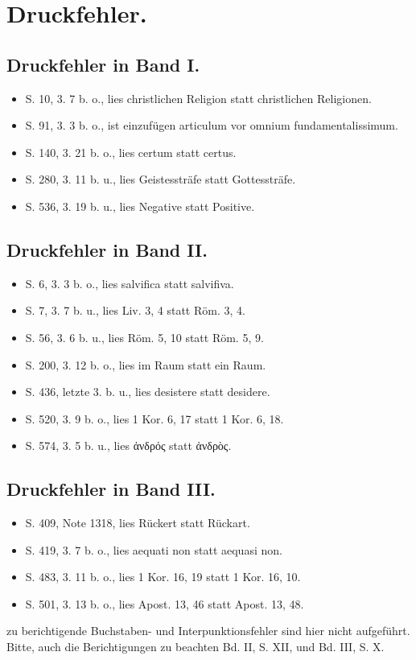\centering\n\section*{Druckfehler.}\n\n\subsection*{\textbf{Druckfehler in Band I.}}\n\begin{itemize}\n    \item S. 10, 3. 7 b. o., lies christlichen Religion statt christlichen Religionen.\n    \item S. 91, 3. 3 b. o., ist einzufügen articulum vor omnium fundamentalissimum.\n    \item S. 140, 3. 21 b. o., lies certum statt certus.\n    \item S. 280, 3. 11 b. u., lies Geistessträfe statt Gottessträfe.\n    \item S. 536, 3. 19 b. u., lies Negative statt Positive.\n\end{itemize}\n\n\subsection*{\textbf{Druckfehler in Band II.}}\n\begin{itemize}\n    \item S. 6, 3. 3 b. o., lies salvifica statt salvifiva.\n    \item S. 7, 3. 7 b. u., lies Liv. 3, 4 statt Röm. 3, 4.\n    \item S. 56, 3. 6 b. u., lies Röm. 5, 10 statt Röm. 5, 9.\n    \item S. 200, 3. 12 b. o., lies im Raum statt ein Raum.\n    \item S. 436, letzte 3. b. u., lies desistere statt desidere.\n    \item S. 520, 3. 9 b. o., lies 1 Kor. 6, 17 statt 1 Kor. 6, 18.\n    \item S. 574, 3. 5 b. u., lies ἀνδρός statt ἀνδρὸς.\n\end{itemize}\n\n\subsection*{\textbf{Druckfehler in Band III.}}\n\begin{itemize}\n    \item S. 409, Note 1318, lies Rückert statt Rückart.\n    \item S. 419, 3. 7 b. o., lies aequati non statt aequasi non.\n    \item S. 483, 3. 11 b. o., lies 1 Kor. 16, 19 statt 1 Kor. 16, 10.\n    \item S. 501, 3. 13 b. o., lies Apost. 13, 46 statt Apost. 13, 48.\n\end{itemize}\n\nGleich zu berichtigende Buchstaben- und Interpunktionsfehler sind hier nicht aufgeführt. Bitte, auch die Berichtigungen zu beachten Bd. II, S. XII, und Bd. III, S. X.